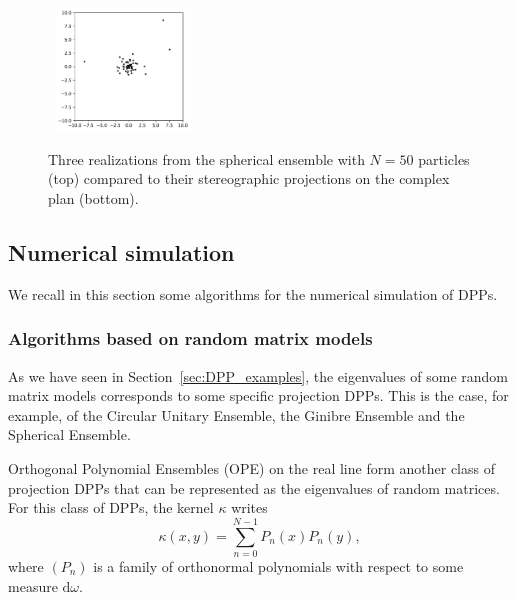 \documentclass[twoside,11pt]{book}
\newtheorem{theorem}{Theorem}
\numberwithin{theorem}{chapter}
\numberwithin{definition}{chapter}
\numberwithin{proposition}{chapter}
\numberwithin{corollary}{chapter}
\numberwithin{example}{chapter}
\numberwithin{lemma}{chapter}
\numberwithin{assumption}{chapter}
\begin{document}
\begin{figure}
~\includegraphics[width= 0.32\textwidth]{img/Spherical/Spherical_beforestero_50_example_id_3.pdf}\\
\caption{Three realizations from the spherical ensemble with $N = 50$ particles (top) compared to their stereographic projections on the complex plan (bottom). \label{fig:spherical_ensemble}}
\end{figure}



\subsection{Numerical simulation}\label{sec:num_algos_dpps}
We recall in this section some algorithms for the numerical simulation of DPPs.


\subsubsection{Algorithms based on random matrix models}
As we have seen in Section~\ref{sec:DPP_examples}, the eigenvalues of some random matrix models corresponds to some specific projection DPPs. This is the case, for example, of the Circular Unitary Ensemble, the Ginibre Ensemble and the Spherical Ensemble. 

Orthogonal Polynomial Ensembles (OPE) on the real line form another class of projection DPPs that can be represented as the eigenvalues of random matrices. For this class of DPPs, the kernel $\kappa$ writes
\begin{equation}
\kappa(x,y) = \sum\limits_{n =0}^{N-1} P_{n}(x)P_{n}(y),
\end{equation}
where $(P_{n})$ is a family of orthonormal polynomials with respect to some measure $\mathrm{d}\omega$.
\end{document}

